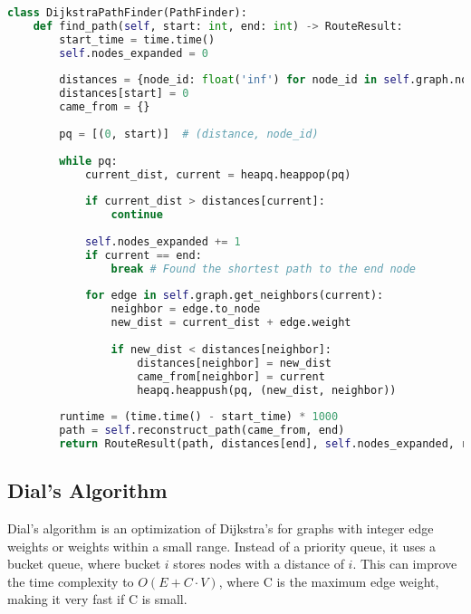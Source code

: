 \documentclass[12pt, a4paper]{report}
\begin{document}
\begin{lstlisting}[language=Python, caption={Code Snippet: `DijkstraPathFinder' from `algorithms.py'}, label={lst:dijkstra}]
class DijkstraPathFinder(PathFinder):
    def find_path(self, start: int, end: int) -> RouteResult:
        start_time = time.time()
        self.nodes_expanded = 0
        
        distances = {node_id: float('inf') for node_id in self.graph.nodes}
        distances[start] = 0
        came_from = {}
        
        pq = [(0, start)]  # (distance, node_id)
        
        while pq:
            current_dist, current = heapq.heappop(pq)
            
            if current_dist > distances[current]:
                continue
            
            self.nodes_expanded += 1
            if current == end:
                break # Found the shortest path to the end node
            
            for edge in self.graph.get_neighbors(current):
                neighbor = edge.to_node
                new_dist = current_dist + edge.weight
                
                if new_dist < distances[neighbor]:
                    distances[neighbor] = new_dist
                    came_from[neighbor] = current
                    heapq.heappush(pq, (new_dist, neighbor))
        
        runtime = (time.time() - start_time) * 1000
        path = self.reconstruct_path(came_from, end)
        return RouteResult(path, distances[end], self.nodes_expanded, runtime, 'dijkstra')
\end{lstlisting}

\subsection{Dial's Algorithm}
Dial's algorithm is an optimization of Dijkstra's for graphs with integer edge weights or weights within a small range. Instead of a priority queue, it uses a bucket queue, where bucket $i$ stores nodes with a distance of $i$. This can improve the time complexity to $O(E + C \cdot V)$, where C is the maximum edge weight, making it very fast if C is small.
\end{document}
